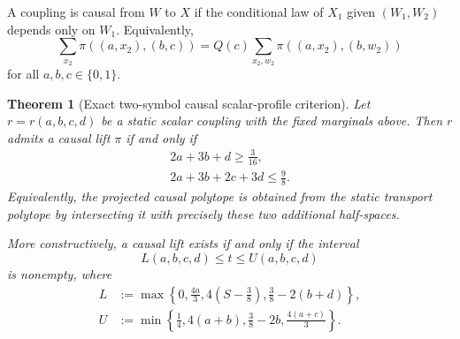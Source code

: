 \documentclass[11pt,a4paper]{article}
\newtheorem{theorem}{Theorem}[section]
\theoremstyle{definition}
\theoremstyle{remark}
\newcommand{\bits}{\{0,1\}}
\begin{document}
A coupling is causal from \(W\) to \(X\) if the conditional law of \(X_1\)
given \((W_1,W_2)\) depends only on \(W_1\).  Equivalently,
\begin{equation}
 \sum_{x_2}\pi((a,x_2),(b,c))
 =Q(c)\sum_{x_2,w_2}\pi((a,x_2),(b,w_2))
 \label{eq:causalLPconstraints}
\end{equation}
for all \(a,b,c\in\bits\).

\begin{theorem}[Exact two-symbol causal scalar-profile criterion]
\label{thm:twofacet}
Let \(r=r(a,b,c,d)\) be a static scalar coupling with the fixed marginals
above.  Then \(r\) admits a causal lift \(\pi\) if and only if
\begin{align}
 \boxed{2a+3b+d\ge\frac3{16}},
 \label{eq:facet1}\\
 \boxed{2a+3b+2c+3d\le\frac98}.
 \label{eq:facet2}
\end{align}
Equivalently, the projected causal polytope is obtained from the static
transport polytope by intersecting it with precisely these two additional
half-spaces.

More constructively, a causal lift exists if and only if the interval
\begin{equation}
 \boxed{L(a,b,c,d)\le t\le U(a,b,c,d)}
 \label{eq:tinterval}
\end{equation}
is nonempty, where
\begin{align}
 L&:=\max\left\{
 0,\frac{4a}{3},4\left(S-\frac38\right),
 \frac38-2(b+d)\right\},
 \label{eq:Ldef}\\
 U&:=\min\left\{
 \frac14,4(a+b),\frac38-2b,\frac{4(a+c)}3\right\}.
 \label{eq:Udef}
\end{align}
\end{theorem}
\end{document}
